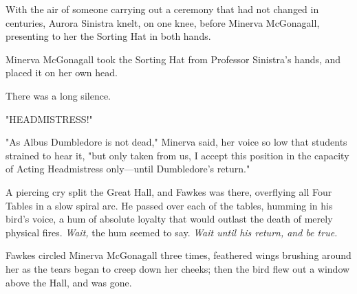 With the air of someone carrying out a ceremony that had not changed in
centuries, Aurora Sinistra knelt, on one knee, before Minerva McGonagall,
presenting to her the Sorting Hat in both hands.

Minerva McGonagall took the Sorting Hat from Professor Sinistra’s hands, and
placed it on her own head.

There was a long silence.

"HEADMISTRESS!"

"As Albus Dumbledore is not dead," Minerva said, her voice so low that students
strained to hear it, "but only taken from us, I accept this position in the
capacity of Acting Headmistress only—until Dumbledore’s return."

A piercing cry split the Great Hall, and Fawkes was there, overflying all Four
Tables in a slow spiral arc. He passed over each of the tables, humming in his
bird’s voice, a hum of absolute loyalty that would outlast the death of merely
physical fires. \emph{Wait,} the hum seemed to say. \emph{Wait until his
return, and be true.}

Fawkes circled Minerva McGonagall three times, feathered wings brushing around
her as the tears began to creep down her cheeks; then the bird flew out a
window above the Hall, and was gone.
